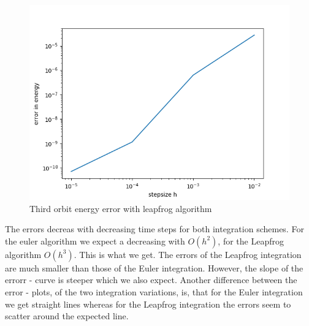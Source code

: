 \documentclass[11pt, a4paper, reqno]{scrartcl}
\begin{document}
    		\begin{figure}[H]
    			\includegraphics[width=.5\paperwidth]{figure_leap_3_2.png}
    			\caption{Third orbit energy error with leapfrog algorithm}
    		\end{figure}
    		
    		
    		The errors decreas with decreasing time steps for both integration 
    		schemes. For the euler algorithm we expect a decreasing with $O(h^2)
    		$, for the Leapfrog algorithm $O(h^3)$. This is what we get. The 
    		errors of the Leapfrog integration are much smaller than those of 
    		the Euler integration. However, the slope of the errorr - curve is 
    		steeper which we also expect. Another difference between the error - 
    		plots, of the two integration variations, is, that for the Euler 
    		integration we get straight lines whereas for the Leapfrog 
    		integration the errors seem to scatter around the expected line. 
\end{document}
